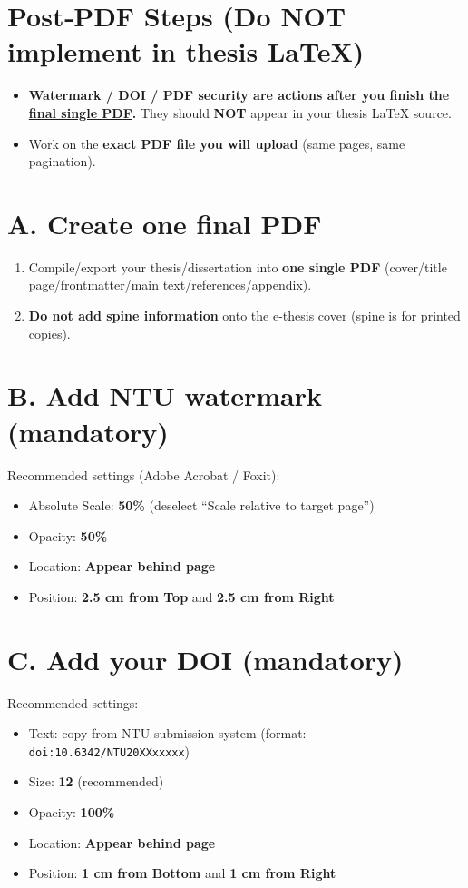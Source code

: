 \documentclass[12pt,a4paper]{article}
\begin{document}
\section*{Post‑PDF Steps (Do NOT implement in thesis LaTeX)}
\begin{itemize}
  \item \textbf{Watermark / DOI / PDF security are actions after you finish the \underline{final single PDF}.}
        They should \textbf{NOT} appear in your thesis LaTeX source.
  \item Work on the \textbf{exact PDF file you will upload} (same pages, same pagination).
\end{itemize}

\section*{A. Create one final PDF}
\begin{enumerate}
  \item Compile/export your thesis/dissertation into \textbf{one single PDF} (cover/title page/frontmatter/main text/references/appendix).
  \item \textbf{Do not add spine information} onto the e-thesis cover (spine is for printed copies).
\end{enumerate}

\section*{B. Add NTU watermark (mandatory)}
Recommended settings (Adobe Acrobat / Foxit):
\begin{itemize}
  \item Absolute Scale: \textbf{50\%} (deselect ``Scale relative to target page'')
  \item Opacity: \textbf{50\%}
  \item Location: \textbf{Appear behind page}
  \item Position: \textbf{2.5 cm from Top} and \textbf{2.5 cm from Right}
\end{itemize}

\section*{C. Add your DOI (mandatory)}
Recommended settings:
\begin{itemize}
  \item Text: copy from NTU submission system (format: \texttt{doi:10.6342/NTU20XXxxxxx})
  \item Size: \textbf{12} (recommended)
  \item Opacity: \textbf{100\%}
  \item Location: \textbf{Appear behind page}
  \item Position: \textbf{1 cm from Bottom} and \textbf{1 cm from Right}
\end{itemize}
\end{document}
